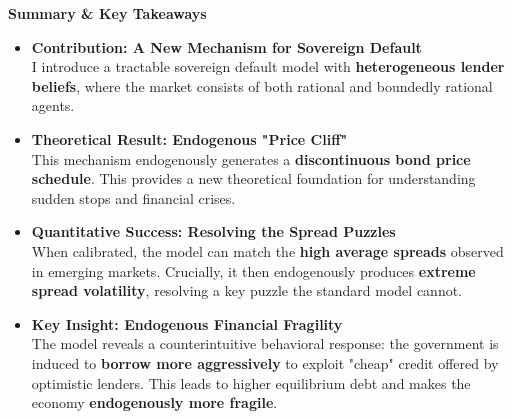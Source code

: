 \begin{center}
\textbf{Summary \& Key Takeaways}
\end{center}

\vspace{1cm}

\begin{itemize}
    \item \textbf{Contribution: A New Mechanism for Sovereign Default}\\
    I introduce a tractable sovereign default model with \textbf{heterogeneous lender beliefs}, where the market consists of both rational and boundedly rational agents.
    
    \vspace{0.7cm}

    \item \textbf{Theoretical Result: Endogenous "Price Cliff"}\\
    This mechanism endogenously generates a \textbf{discontinuous bond price schedule}. This provides a new theoretical foundation for understanding sudden stops and financial crises.
    
    \vspace{0.7cm}
    
    \item \textbf{Quantitative Success: Resolving the Spread Puzzles}\\
    When calibrated, the model can match the \textbf{high average spreads} observed in emerging markets. Crucially, it then endogenously produces \textbf{extreme spread volatility}, resolving a key puzzle the standard model cannot.

    \vspace{0.7cm}

    \item \textbf{Key Insight: Endogenous Financial Fragility}\\
    The model reveals a counterintuitive behavioral response: the government is induced to \textbf{borrow more aggressively} to exploit "cheap" credit offered by optimistic lenders. This leads to higher equilibrium debt and makes the economy \textbf{endogenously more fragile}.

\end{itemize}